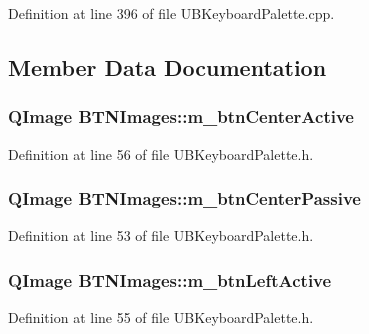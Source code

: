 Definition at line 396 of file U\-B\-Keyboard\-Palette.\-cpp.



\subsection{Member Data Documentation}
\hypertarget{class_b_t_n_images_a23084a4c3770f2d2b46b15857baf4e34}{
\subsubsection[{m\-\_\-btn\-Center\-Active}]{\setlength{\rightskip}{0pt plus 5cm}Q\-Image B\-T\-N\-Images\-::m\-\_\-btn\-Center\-Active}}\label{d2/d5c/class_b_t_n_images_a23084a4c3770f2d2b46b15857baf4e34}


Definition at line 56 of file U\-B\-Keyboard\-Palette.\-h.

\hypertarget{class_b_t_n_images_a6dc5d1651cb8be8e28917e0719f20172}{
\subsubsection[{m\-\_\-btn\-Center\-Passive}]{\setlength{\rightskip}{0pt plus 5cm}Q\-Image B\-T\-N\-Images\-::m\-\_\-btn\-Center\-Passive}}\label{d2/d5c/class_b_t_n_images_a6dc5d1651cb8be8e28917e0719f20172}


Definition at line 53 of file U\-B\-Keyboard\-Palette.\-h.

\hypertarget{class_b_t_n_images_a9f04495a0692b8ad05b44c8942d2cc17}{
\subsubsection[{m\-\_\-btn\-Left\-Active}]{\setlength{\rightskip}{0pt plus 5cm}Q\-Image B\-T\-N\-Images\-::m\-\_\-btn\-Left\-Active}}\label{d2/d5c/class_b_t_n_images_a9f04495a0692b8ad05b44c8942d2cc17}


Definition at line 55 of file U\-B\-Keyboard\-Palette.\-h.

